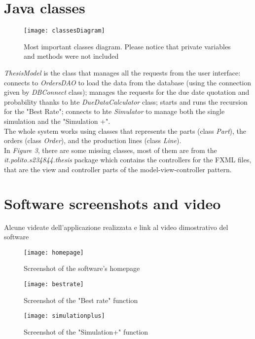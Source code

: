 \documentclass[a4paper,12pt]{article}
\begin{document}
\section{Java classes}
\begin{figure}[H]
	\centering
   	 \texttt{[image: classesDiagram]}
	\caption{Most important classes diagram. Please notice that private variables and methods were not included}
\end{figure}
\textit{ThesisModel} is the class that manages all the requests from the user interface: connects to \textit{OrdersDAO} to load the data from the database (using the connection given by \textit{DBConnect} class); manages the requests for the due date quotation and probability thanks to hte \textit{DueDataCalculator} class; starts and runs the recursion for the "Best Rate"; connects to hte \textit{Simulator} to manage both the single simulation and the "Simulation +".\\
The whole system works using classes that represents the parts (class \textit{Part}), the orders (class \textit{Order}), and the production lines (class \textit{Line}).\\
In \textit{Figure 3}, there are some missing classes, most of them are from the \textit{it.polito.s234844.thesis} package which contains the controllers for the FXML files, that are the view and controller parts of the model-view-controller pattern. 

\newpage
\section{Software screenshots and video}
Alcune videate dell’applicazione realizzata e link al video dimostrativo del software
\begin{figure}[H]
	\centering
   	 \texttt{[image: homepage]}
	\caption{Screenshot of the software's homepage}
\end{figure}

\begin{figure}[H]
	\centering
   	 \texttt{[image: bestrate]}
	\caption{Screenshot of the "Best rate" function}
\end{figure}

\begin{figure}[H]
	\centering
   	 \texttt{[image: simulationplus]}
	\caption{Screenshot of the "Simulation+" function}
\end{figure}
\end{document}
